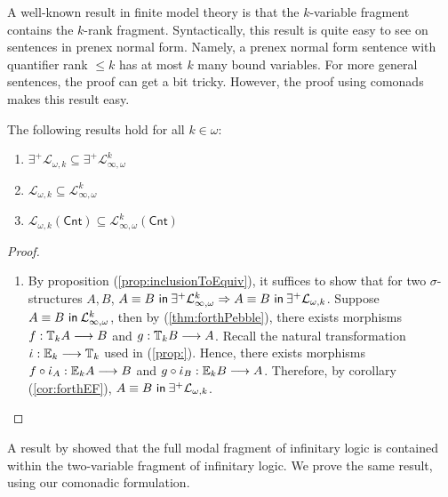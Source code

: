 A well-known result in finite model theory is that the $k$-variable fragment contains the $k$-rank fragment. Syntactically, this result is quite easy to see on sentences in prenex normal form. Namely, a prenex normal form sentence with quantifier rank $\leq k$ has at most $k$ many bound variables. For more general sentences, the proof can get a bit tricky. However, the proof using comonads makes this result easy. 
\begin{prop} The following results hold for all $k \in \omega$:
\begin{enumerate}[label=(\arabic*)]
\item $\exists^{+}\mathcal{L}_{\omega,k} \subseteq \exists^{+}\mathcal{L}^{k}_{\infty,\omega}$
\item $\mathcal{L}_{\omega,k} \subseteq \mathcal{L}^{k}_{\infty,\omega}$
\item $\mathcal{L}_{\omega,k}(\mathsf{Cnt}) \subseteq \mathcal{L}^{k}_{\infty,\omega}(\mathsf{Cnt})$
\end{enumerate}
\begin{proof}
\begin{enumerate}[label=(\arabic*)]
\item By proposition (\ref{prop:inclusionToEquiv}), it suffices to show that for two $\sigma$-structures $A,B$, ${A \equiv B \ \mathsf{in}\: \exists^{+}\mathcal{L}^{k}_{\infty,\omega}} \Rightarrow {A \equiv B \ \mathsf{in}\: \exists^{+}\mathcal{L}_{\omega,k}}$. Suppose ${A \equiv B \ \mathsf{in}\: \mathcal{L}^{k}_{\infty,\omega}} $, then by (\ref{thm:forthPebble}), there exists morphisms $f:{\mathbb{T}_{k}A} \longrightarrow B$ and $g:{\mathbb{T}_{k}B} \longrightarrow A$. Recall the natural transformation $\iota:\efcomonad{k}{} \longrightarrow \pcomonad{k}{}$ used in (\ref{prop:}). Hence, there exists morphisms $f \circ \iota_{A}:\efcomonad{k}{A} \longrightarrow B$ and $g \circ \iota_{B}:\efcomonad{k}{B} \longrightarrow A$. Therefore, by corollary (\ref{cor:forthEF}), ${A \equiv B \ \mathsf{in}\: \exists^{+}\mathcal{L}_{\omega,k}}$.
\end{enumerate}
\end{proof}
\end{prop}
A result by \cite{Gabbay1981} showed that the full modal fragment of infinitary logic is contained within the two-variable fragment of infinitary logic. We prove the same result, using our comonadic formulation.
